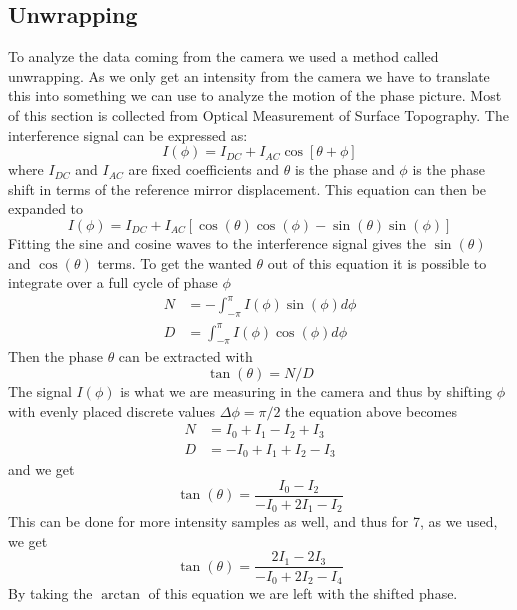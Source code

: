 \subsection {Unwrapping}
To analyze the data coming from the camera we used a method called unwrapping.
As we only get an intensity from the camera we have to translate this into something
we can use to analyze the motion of the phase picture. Most of this section
is collected from Optical Measurement of Surface Topography.\cite{omst} 
The interference signal can be expressed as:
\begin {equation}
I(\phi) = I_{DC} + I_{AC}\cos[\theta + \phi]
\end {equation}
where $I_{DC}$ and $I_{AC}$ are fixed coefficients and $\theta$ is the phase and
$\phi$ is the phase shift in terms of the reference mirror displacement.
This equation can then be expanded to
\begin {equation}
I(\phi) = I_{DC} + I_{AC}[\cos(\theta)\cos(\phi) - \sin(\theta)\sin(\phi)]
\end {equation}
Fitting the sine and cosine waves to the interference signal gives the $\sin(\theta)$
and $\cos(\theta)$ terms.
To get the wanted $\theta$ out of this equation it is possible to integrate over
a full cycle of phase $\phi$
\begin {align}
N &= -\int_{-\pi}^{\pi}I(\phi)\sin(\phi)d\phi\\
D &= \int_{-\pi}^{\pi}I(\phi)\cos(\phi)d\phi
\end {align}
Then the phase $\theta$ can be extracted with
\begin {equation}
\tan(\theta) = N/D
\end {equation}
The signal $I(\phi)$ is what we are measuring in the camera and thus by shifting
$\phi$ with evenly placed discrete values $\Delta\phi = \pi/2$ the equation above
becomes
\begin {align}
N &= I_0 +I_1 - I_2 + I_3\\
D &= -I_0 + I_1 + I_2 - I_3
\end {align}
and we get 
\begin {equation}
\tan(\theta) = \frac{I_0 - I_2}{-I_0 + 2I_1 - I_2}
\end {equation}
This can be done for more intensity samples as well, and thus for 7, as we used,
we get
\begin {equation}
\tan(\theta) = \frac{2I_1 - 2I_3}{-I_0 + 2I_2 - I_4}
\end {equation}
By taking the $\arctan$ of this equation we are left with the shifted phase.
